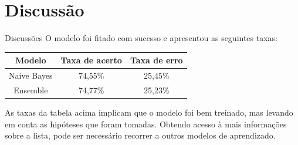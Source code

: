 \documentclass[compress]{beamer}
\begin{document}
\section{Discussão}
\begin{frame}{Discussões}
    O modelo foi fitado com sucesso e apresentou as seguintes taxas:
    \begin{table}[h!]
        \centering
        \begin{tabular}{|c|c|c|}
            \hline
            Modelo &  Taxa de acerto & Taxa de erro\\
            \hline
            Naive Bayes & 74,55\%&  25,45\%\\
            \hline
            Ensemble & 74,77\% &25,23\%\\
            \hline
        \end{tabular}
    \end{table}
    
    As taxas da tabela acima implicam que o modelo foi bem treinado, mas levando em conta as hipóteses que foram tomadas. Obtendo acesso à mais informações sobre a lista, pode ser necessário recorrer a outros modelos de aprendizado.
\end{frame}
\end{document}
